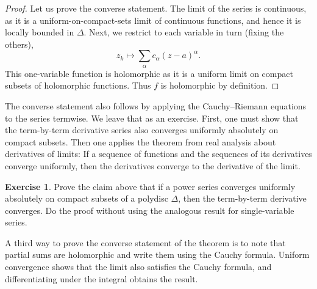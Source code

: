 \documentclass[12pt,openany]{book}
\theoremstyle{plain}
\theoremstyle{remark}
\theoremstyle{definition}
\newenvironment{exbox}{%
    \def\FrameCommand{\vrule width 1pt \relax\hspace{10pt}}%
    \MakeFramed{\advance\hsize-\width\FrameRestore}%
}{%
    \endMakeFramed
}
\theoremstyle{exercise}
\newtheorem{exercise}{Exercise}[section]
\theoremstyle{example}
\begin{document}
\begin{proof}
Let us prove the converse statement.
The limit of the series
is continuous, as it is a uniform-on-compact-sets limit of continuous
functions, and hence it is locally bounded in $\Delta$.  Next,
we restrict to each variable in turn (fixing the others),
\begin{equation*}
z_k \mapsto \sum_{\alpha} c_\alpha {(z-a)}^\alpha .
\end{equation*}
This one-variable function is holomorphic as it is a uniform limit on compact subsets of
holomorphic functions.  Thus $f$ is holomorphic by definition.
\end{proof}

The converse statement also follows by applying the Cauchy--Riemann
equations to the series termwise.
We leave that as an exercise.
First, one must show that the term-by-term derivative
series also converges uniformly absolutely on compact subsets.
Then one applies the theorem from real analysis about derivatives
of limits: If a sequence of functions and the sequences of its derivatives converge
uniformly, then the derivatives converge to the derivative of the limit.

\begin{exbox}
\begin{exercise}
Prove the claim above that if a power series converges uniformly absolutely
on compact subsets of a polydisc $\Delta$, then the term-by-term derivative
converges.
Do the proof without using the analogous result for single-variable series.
\end{exercise}
\end{exbox}

\pagebreak[1]
A third way to prove the converse statement of the theorem
is to note that partial sums are
holomorphic and write them using the Cauchy formula.  Uniform
convergence shows that the limit also satisfies the Cauchy formula, and
differentiating under the integral obtains the result.
\end{document}
